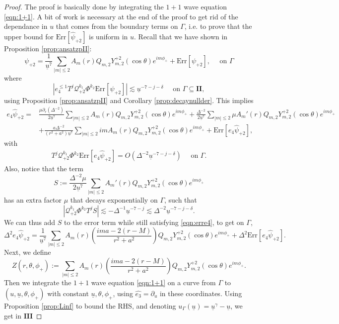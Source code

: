 \documentclass[reqno]{amsart}
\numberwithin{equation}{section}
\newcommand{\mcq}{\mathcal{Q}}
\newcommand{\ubar}{{\underline{u}}}
\newcommand{\errp}{\mathrm{Err}[\Psip]}
\newcommand{\carterp}{\mcq_{+2}}
\newcommand{\psihat}{\widehat{\psi}}
\newcommand{\ethat}{\widehat{e_3}}
\newcommand{\deux}{\mathbf{II}}
\newcommand{\trois}{\mathbf{III}}
\newcommand{\Psip}{\psi_{+2}}
\newcommand{\psip}{\psi_{+2}}
\newcommand{\psihatp}{\psihat_{+2}}
\newcommand{\sfrak}{2}
\theoremstyle{plain}
\theoremstyle{definition}
\theoremstyle{remark}
\numberwithin{equation}{section}
\begin{document}
\begin{proof}
The proof is basically done by integrating the $1+1$ wave equation \eqref{eqn:1+1}. A bit of work is necessary at the end of the proof to get rid of the dependance in $u$ that comes from the boundary terms on $\Gamma$, i.e. to prove that the upper bound for $\mathrm{Err}[\psihatp]$ is uniform in $u$. Recall that we have shown in Proposition \ref{prop:ansatzpII}:
$$\psip=\frac{1}{\ubar^{7}}\sum_{|m|\leq2}A_m(r)Q_{m,\sfrak}Y_{m,\sfrak}^{+\sfrak}(\cos\theta)e^{im\phi_{+}}+\errp,\quad\text{   on   }\Gamma$$
where $$|e_4^{\leq 1}T^j\carterp^{k_1}\Phi^{k_2}\errp|\lesssim\ubar^{-7-j-\delta}\quad\text{  on  }\Gamma\subseteq\deux,$$
using Proposition \ref{prop:ansatzpII} and Corollary \ref{prop:decaynullder}. This implies 
\begin{align}
    e_4\psihatp=&\frac{\mu\partial_r(\Delta^{-2})}{2\ubar^7}\sum_{|m|\leq2}A_m(r)Q_{m,\sfrak}Y_{m,\sfrak}^{+\sfrak}(\cos\theta)e^{im\phi_{+}}+\frac{\Delta^{-2}}{2\ubar^7}\sum_{|m|\leq2}\mu A_m'(r)Q_{m,\sfrak}Y_{m,\sfrak}^{+\sfrak}(\cos\theta)e^{im\phi_{+}}\nonumber\\
    &+\frac{a\Delta^{-2}}{(r^2+a^2)\ubar^7}\sum_{|m|\leq2}imA_m(r)Q_{m,\sfrak}Y_{m,\sfrak}^{+\sfrak}(\cos\theta)e^{im\phi_{+}}+{\mathrm{Err}[e_4\psihatp]},\label{eqn:cpf}
\end{align}
with 
\begin{align}\label{eqn:erre4}
    T^j\carterp^{k_1}\Phi^{k_2}{\mathrm{Err}[e_4\psihatp]}=O(\Delta^{-2}\ubar^{-7-j-\delta})\quad\text{   on   }\Gamma.
\end{align}
Also, notice that the term 
$$S:=\frac{\Delta^{-2}\mu}{2\ubar^7}\sum_{|m|\leq2} A_m'(r)Q_{m,\sfrak}Y_{m,\sfrak}^{+\sfrak}(\cos\theta)e^{im\phi_{+}}$$
has an extra factor $\mu$ that decays exponentially on $\Gamma$, such that $$|\carterp^{k_1}\Phi^{k_2}T^jS|\lesssim-\Delta^{-1}\ubar^{-7-j}\lesssim \Delta^{-2}\ubar^{-7-j-\delta}.$$
We can thus add $S$ to the error term while still satisfying \eqref{eqn:erre4}, to get on $\Gamma$,
$$\Delta^2e_4\psihatp=\frac{1}{\ubar^7}\sum_{|m|\leq2}A_m(r)\left(\frac{ima-2(r-M)}{r^2+a^2}\right)Q_{m,\sfrak}Y_{m,\sfrak}^{+\sfrak}(\cos\theta)e^{im\phi_{+}}+\Delta^{2}{\mathrm{Err}[e_4\psihatp]}.$$
Next, we define 
$$Z(r,\theta,\phi_{+}):=\sum_{|m|\leq2}A_m(r)\left(\frac{ima-2(r-M)}{r^2+a^2}\right)Q_{m,\sfrak}Y_{m,\sfrak}^{+\sfrak}(\cos\theta)e^{im\phi_{+}}.$$
Then we integrate the $1+1$ wave equation \eqref{eqn:1+1} on a curve from $\Gamma$ to $(u,\ubar,\theta,\phi_{+})$ with  constant $\ubar,\theta,\phi_{+}$, using $\ethat=\partial_u$ in these coordinates. Using Proposition \ref{prop:Linf} to bound the RHS, and denoting $u_\Gamma(\ubar)=\ubar^\gamma-\ubar$, we get in $\trois$

\end{proof}
\end{document}
